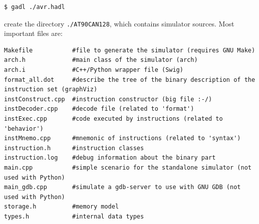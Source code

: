 \begin{verbatim}
$ gadl ./avr.hadl
\end{verbatim}
create the directory  \texttt{./AT90CAN128}, which contains simulator sources. Most important files are:

\begin{verbatim}
Makefile           #file to generate the simulator (requires GNU Make)
arch.h             #main class of the simulator (arch)
arch.i             #C++/Python wrapper file (Swig)
format_all.dot     #describe the tree of the binary description of the instruction set (graphViz)
instConstruct.cpp  #instruction constructor (big file :-/)
instDecoder.cpp    #decode file (related to 'format')
instExec.cpp       #code executed by instructions (related to 'behavior')
instMnemo.cpp      #mnemonic of instructions (related to 'syntax')
instruction.h      #instruction classes
instruction.log    #debug information about the binary part
main.cpp           #simple scenario for the standalone simulator (not used with Python)
main_gdb.cpp       #simulate a gdb-server to use with GNU GDB (not used with Python)
storage.h          #memory model
types.h            #internal data types
\end{verbatim}

